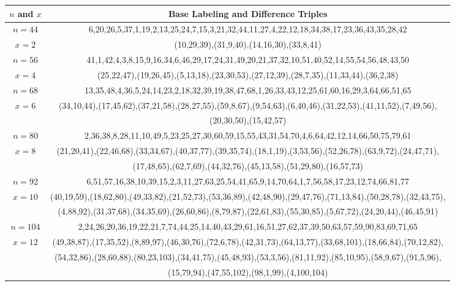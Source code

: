 \begin{tabular}{| c | c |}
\hline
\(n\) and \(x\) & Base Labeling and Difference Triples\\
\hline
\(n=44\) & 
6,20,26,5,37,1,19,2,13,25,24,7,15,3,21,32,44,11,27,4,22,12,18,34,38,17,23,36,43,35,28,42\\
\cline{2-2}
\(x=2\)
&(10,29,39),(31,9,40),(14,16,30),(33,8,41)\\
\hline 
\(n=56\) & 
41,1,42,4,3,8,15,9,16,34,6,46,29,17,24,31,49,20,21,37,32,10,51,40,52,14,55,54,56,48,43,50\\
\cline{2-2}
\(x=4\)
&(25,22,47),(19,26,45),(5,13,18),(23,30,53),(27,12,39),(28,7,35),(11,33,44),(36,2,38)\\
\hline 
\(n=68\) & 
13,35,48,4,36,5,24,14,23,2,18,32,39,19,38,47,68,1,26,33,43,12,25,61,60,16,29,3,64,66,51,65\\
\cline{2-2}
\(x=6\)
&(34,10,44),(17,45,62),(37,21,58),(28,27,55),(59,8,67),(9,54,63),(6,40,46),(31,22,53),(41,11,52),(7,49,56),\\
&(20,30,50),(15,42,57)\\
\hline 
\(n=80\) & 
2,36,38,8,28,11,10,49,5,23,25,27,30,60,59,15,55,43,31,54,70,4,6,64,42,12,14,66,50,75,79,61\\
\cline{2-2}
\(x=8\)
&(21,20,41),(22,46,68),(33,34,67),(40,37,77),(39,35,74),(18,1,19),(3,53,56),(52,26,78),(63,9,72),(24,47,71),\\
&(17,48,65),(62,7,69),(44,32,76),(45,13,58),(51,29,80),(16,57,73)\\
\hline 
\(n=92\) & 
6,51,57,16,38,10,39,15,2,3,11,27,63,25,54,41,65,9,14,70,64,1,7,56,58,17,23,12,74,66,81,77\\
\cline{2-2}
\(x=10\)
&(40,19,59),(18,62,80),(49,33,82),(21,52,73),(53,36,89),(42,48,90),(29,47,76),(71,13,84),(50,28,78),(32,43,75),\\
&(4,88,92),(31,37,68),(34,35,69),(26,60,86),(8,79,87),(22,61,83),(55,30,85),(5,67,72),(24,20,44),(46,45,91)\\
\hline 
\(n=104\) & 
2,24,26,20,36,19,22,21,7,74,44,25,14,40,43,29,61,16,51,27,62,37,39,50,63,57,59,90,83,69,71,65\\
\cline{2-2}
\(x=12\)
&(49,38,87),(17,35,52),(8,89,97),(46,30,76),(72,6,78),(42,31,73),(64,13,77),(33,68,101),(18,66,84),(70,12,82),\\
&(54,32,86),(28,60,88),(80,23,103),(34,41,75),(45,48,93),(53,3,56),(81,11,92),(85,10,95),(58,9,67),(91,5,96),\\
&(15,79,94),(47,55,102),(98,1,99),(4,100,104)\\
\hline 

\end{tabular}
